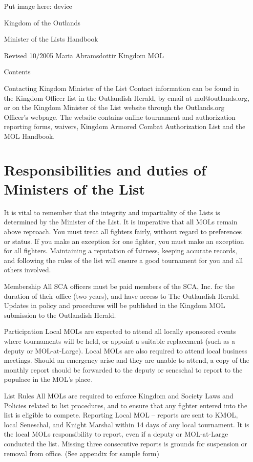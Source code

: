 \documentclass{article}
\begin{document}
Put image here: device
\begin{center}
{\Huge
Kingdom of the Outlands

Minister of the Lists
Handbook
}\end{center}

Revised 10/2005
Maria Abramsdottir
Kingdom MOL

Contents

\tableofcontents

Contacting Kingdom Minister of the List
Contact information can be found in the Kingdom Officer list in the Outlandish Herald, by email at
mol@outlands.org, or on the Kingdom Minister of the List website through the Outlands.org
Officer’s webpage. The website contains online tournament and authorization reporting forms,
waivers, Kingdom Armored Combat Authorization List and the MOL Handbook.


\section{Responsibilities and duties of Ministers of the List}
It is vital to remember that the integrity and impartiality of the Lists is determined by the Minister of the
List. It is imperative that all MOLs remain above reproach. You must treat all fighters fairly, without
regard to preferences or status. If you make an exception for one fighter, you must make an exception
for all fighters. Maintaining a reputation of fairness, keeping accurate records, and following the rules
of the list will ensure a good tournament for you and all others involved.

Membership All SCA officers must be paid members of the SCA, Inc. for the duration of their office
(two years), and have access to The Outlandish Herald. Updates in policy and procedures
will be published in the Kingdom MOL submission to the Outlandish Herald.

Participation Local MOLs are expected to attend all locally sponsored events where tournaments will be
held, or appoint a suitable replacement (such as a deputy or MOL-at-Large). Local MOLs
are also required to attend local business meetings. Should an emergency arise and they
are unable to attend, a copy of the monthly report should be forwarded to the deputy or
seneschal to report to the populace in the MOL’s place.

List Rules All MOLs are required to enforce Kingdom and Society Laws and Policies related to list
procedures, and to ensure that any fighter entered into the list is eligible to compete.
Reporting Local MOL – reports are sent to KMOL, local Seneschal, and Knight Marshal within 14
days of any local tournament. It is the local MOLs responsibility to report, even if a deputy
or MOL-at-Large conducted the list. Missing three consecutive reports is grounds for
suspension or removal from office. (See appendix for sample form)
\end{document}
